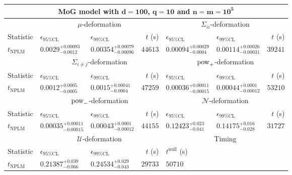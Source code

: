 \begin{tabular}{l|llr|llr}
	\toprule
	\multicolumn{7}{c}{{\bf MoG model with $\mathbf{d=100}$, $\mathbf{q=10}$ and $\mathbf{n=m=10^{5}}$}} \\
	\toprule
	\multicolumn{1}{c}{} & \multicolumn{3}{c}{$\mu$-deformation} & \multicolumn{3}{c}{$\Sigma_{ii}$-deformation} \\
	Statistic & $\epsilon_{95\%\mathrm{CL}}$ & $\epsilon_{99\%\mathrm{CL}}$ & $t$ (s) & $\epsilon_{95\%\mathrm{CL}}$ & $\epsilon_{99\%\mathrm{CL}}$ & $t$ (s) \\
	\midrule
	$t_{\mathrm{NPLM}}$ & $0.0029_{-0.0012}^{+0.00093}$ & $0.00354_{-0.00096}^{+0.00079}$ & $44613$ & $0.00094_{-0.0004}^{+0.00029}$ & $0.00114_{-0.00031}^{+0.00026}$ & $39241$ \\
	\toprule
	\multicolumn{1}{c}{} & \multicolumn{3}{c}{$\Sigma_{i\neq j}$-deformation} & \multicolumn{3}{c}{$\rm{pow}_{+}$-deformation} \\
	Statistic & $\epsilon_{95\%\mathrm{CL}}$ & $\epsilon_{99\%\mathrm{CL}}$ & $t$ (s) & $\epsilon_{95\%\mathrm{CL}}$ & $\epsilon_{99\%\mathrm{CL}}$ & $t$ (s) \\
	\midrule
	$t_{\mathrm{NPLM}}$ & $0.0012_{-0.0005}^{+0.0005}$ & $0.0015_{-0.0004}^{+0.00041}$ & $47259$ & $0.00036_{-0.00015}^{+0.00011}$ & $0.00044_{-0.00012}^{+0.0001}$ & $53210$ \\
	\toprule
	\multicolumn{1}{c}{} & \multicolumn{3}{c}{$\rm{pow}_{-}$-deformation} & \multicolumn{3}{c}{$\mathcal{N}$-deformation} \\
	Statistic & $\epsilon_{95\%\mathrm{CL}}$ & $\epsilon_{99\%\mathrm{CL}}$ & $t$ (s) & $\epsilon_{95\%\mathrm{CL}}$ & $\epsilon_{99\%\mathrm{CL}}$ & $t$ (s) \\
	\midrule
	$t_{\mathrm{NPLM}}$ & $0.00035_{-0.00015}^{+0.00011}$ & $0.00043_{-0.00012}^{+0.0001}$ & $44155$ & $0.12423_{-0.041}^{+0.023}$ & $0.14175_{-0.028}^{+0.016}$ & $31727$ \\
	\toprule
	\multicolumn{1}{c}{} & \multicolumn{3}{c}{$\mathcal{U}$-deformation} & \multicolumn{3}{c}{Timing} \\
	Statistic & $\epsilon_{95\%\mathrm{CL}}$ & $\epsilon_{99\%\mathrm{CL}}$ & $t$ (s) & $t^{\mathrm{null}}$ (s) \\
	\midrule
	$t_{\mathrm{NPLM}}$ & $0.21387_{-0.066}^{+0.039}$ & $0.24534_{-0.043}^{+0.029}$ & $29733$ & $50710$ \\
	\bottomrule
\end{tabular}